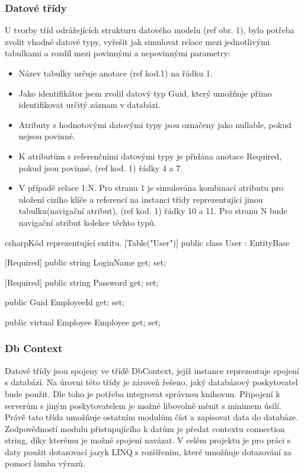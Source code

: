 \documentclass[
  biblatex,
  glossaries,
  index
]{kidiplom}
\begin{document}
\subsubsection{Datové třídy}
 U tvorby tříd odrážejících strukturu datového modelu (ref obr. 1), bylo potřeba zvolit vhodné datové typy, vyřešit jak simulovat relace mezi jednotlivými tabulkami a rozdíl mezi povinnými a nepovinnými parametry:
\begin{itemize}
	\item Název tabulky určuje anotace (ref kod.1) na řádku 1. 
	\item Jako identifikátor jsem zvolil datový typ Guid, který umožňuje přímo identifikovat určitý záznam v databázi.
	\item Atributy s hodnotovými datovými typy jsou označeny jako nullable, pokud nejsou povinné.
	\item K atributům s referenčními datovými typy je přidána anotace Required, pokud jsou povinné, (ref kod. 1) řádky 4 a 7.
	\item V případě relace 1:N. Pro stranu 1 je simulována kombinací atributu pro uložení cizího klíče a referencí na instanci třídy reprezentující jinou tabulku(navigační atribut), (ref kod. 1) řádky 10 a 11. Pro stranu N bude navigační atribut kolekce těchto typů.
\end{itemize}

\begin{kicode}{csharp}{}{Kód reprezentující entitu.}
[Table("User")]
    public class User : EntityBase
    {
        [Required]
        public string LoginName { get; set; }

        [Required]
        public string Password { get; set; }

        public Guid EmployeeId { get; set; }

        public virtual Employee Employee { get; set; }
    }
\end{kicode}

\subsubsection{Db Context}
Datové třídy jsou spojeny ve třídě DbContext, jejíž instance reprezentuje spojení s databází. Na úrovni této třídy je zároveň řešeno, jaký databázový poskytovatel bude použit. Dle toho je potřeba integrovat správnou knihovnu. Připojení k serverům s jiným poskytovatelem je možné libovolně měnit s minimem úsilí. Právě tato třída umožňuje ostatním modulům číst a zapisovat data do databáze. Zodpovědností modulu přistupujícího k datům je předat contextu connection string, díky kterému je možné spojení navázat. V celém projektu je pro práci s daty použit dotazovací jazyk LINQ s rozšířením, které umožňuje dotazování za pomocí lamba výrazů.
\end{document}
